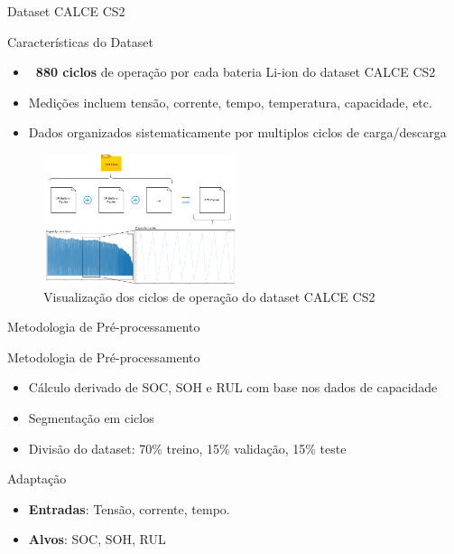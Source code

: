 \documentclass[aspectratio=169,xcolor=dvipsnames]{beamer}
\begin{document}
\begin{frame}{Dataset CALCE CS2}
  \begin{block}{Características do Dataset}
    \begin{itemize}
      \item \textbf{~880 ciclos} de operação por cada bateria Li-ion do dataset CALCE CS2
      \item Medições incluem tensão, corrente, tempo, temperatura, capacidade, etc.
      \item Dados organizados sistematicamente por multiplos ciclos de carga/descarga
    \end{itemize}
  \end{block}
    \begin{figure}
    \centering
    \includegraphics[width=0.5\textwidth]{logos/cycles_files.png}
    \caption{Visualização dos ciclos de operação do dataset CALCE CS2}
  \end{figure}
\end{frame}

\begin{frame}{Metodologia de Pré-processamento}

  \begin{exampleblock}{Metodologia de Pré-processamento}
    \begin{itemize}
      \item Cálculo derivado de SOC, SOH e RUL com base nos dados de capacidade
      \item Segmentação em ciclos
      \item Divisão do dataset: 70\% treino, 15\% validação, 15\% teste
    \end{itemize}
  \end{exampleblock}
  
  \vspace{0.3cm}
  
  \begin{block}{Adaptação}
    \begin{itemize}
      \item \textbf{Entradas}: Tensão, corrente, tempo.
      \item \textbf{Alvos}: SOC, SOH, RUL
    \end{itemize}
  \end{block}
\end{frame}
\end{document}

